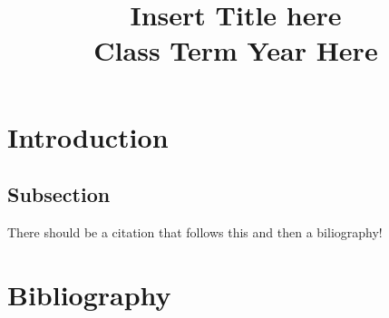 \documentclass[letterpaper, 10pt, draftclsnofoot, onecolumn]{IEEEtran}
\def\name{}
\begin{document}
\title{ Insert Title here \\ {\large Class Term Year Here}}
\author{\name}

\begin{titlepage}

\maketitle

\begin{abstract}

\end{abstract}

\end{titlepage}

\section{Introduction}

\subsection{Subsection}
	
	
		
	\par There should be a citation that follows this and then a biliography!
	\cite{myself}

\newpage
\section{Bibliography}



\end{document}
